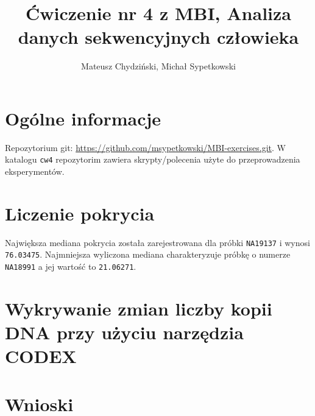 \documentclass[a4paper]{article}
\begin{document}
\title{Ćwiczenie nr 4 z MBI, Analiza danych sekwencyjnych człowieka}
\author{Mateusz Chydziński, Michał Sypetkowski}
\maketitle

\section{Ogólne informacje}
Repozytorium git: \url{https://github.com/msypetkowski/MBI-exercises.git}.
W katalogu \texttt{cw4} repozytorim zawiera skrypty/polecenia użyte do przeprowadzenia eksperymentów.


\section{Liczenie pokrycia}
Największa mediana pokrycia została zarejestrowana dla próbki \texttt{NA19137} i wynosi \texttt{76.03475}. Najmniejsza wyliczona
mediana charakteryzuje próbkę o numerze \texttt{NA18991} a jej wartość to \texttt{21.06271}.


\section{Wykrywanie zmian liczby kopii DNA przy użyciu narzędzia CODEX}


\section{Wnioski}
\end{document}
